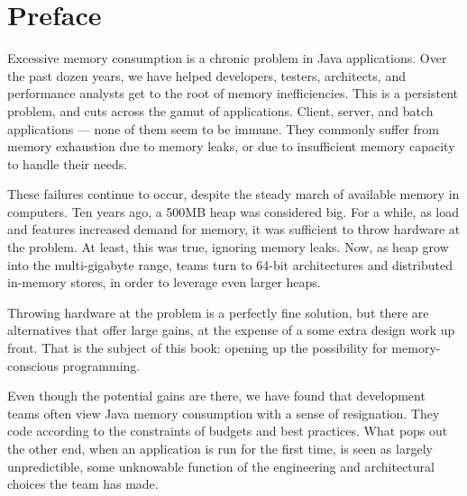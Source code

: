 \chapter*{Preface}
\label{chapter:preface}

Excessive memory consumption is a chronic problem in Java applications.
Over the past dozen years, we have helped developers, testers, architects, and
performance analysts get to the root of memory inefficiencies.
This is a persistent problem, and cuts across the gamut of applications.
Client, server, and batch applications --- none of them seem to be immune. They
commonly suffer from memory exhaustion due to memory leaks, or due to
insufficient memory capacity to handle their needs.

These failures continue to occur, despite the steady march of available memory
in computers. Ten years ago, a 500MB heap was considered big. For a while, as
load and features increased demand for memory, it was sufficient to throw
hardware at the problem. At least, this was true, ignoring memory leaks.
Now, as heap grow into the multi-gigabyte range, teams turn to 64-bit
architectures and distributed in-memory stores, in order to leverage even larger
heaps.






Throwing hardware at the problem is a perfectly fine solution, but there are
alternatives that offer large gains, at the expense of a some extra design
work up front. That is the subject of this book: opening up the possibility for
memory-conscious programming.

Even though the potential gains are there, we have found that development teams
often view Java memory consumption with a sense of resignation. They code
according to the constraints of budgets and best practices. What pops out the
other end, when an application is run for the first time, is seen as largely
unpredictible, some unknowable function of the engineering and architectural
choices the team has made.

